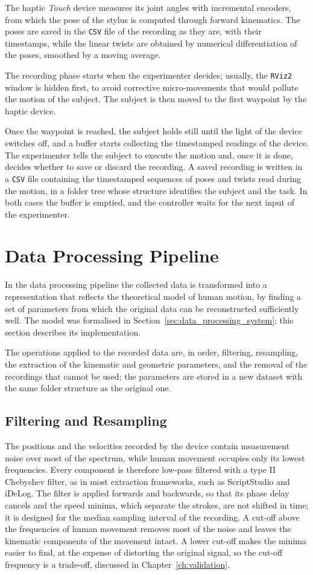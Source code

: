 \documentclass[12pt]{report}
\begin{document}
The haptic \textit{Touch} device measures its joint angles with incremental encoders, from which the pose of the stylus is computed through forward kinematics. The poses are saved in the \texttt{CSV} file of the recording as they are, with their timestamps, while the linear twists are obtained by numerical differentiation of the poses, smoothed by a moving average.

The recording phase starts when the experimenter decides; usually, the \texttt{RViz2} window is hidden first, to avoid corrective micro-movements that would pollute the motion of the subject. The subject is then moved to the first waypoint by the haptic device.

Once the waypoint is reached, the subject holds still until the light of the device switches off, and a buffer starts collecting the timestamped readings of the device. The experimenter tells the subject to execute the motion and, once it is done, decides whether to save or discard the recording. A saved recording is written in a \texttt{CSV} file containing the timestamped sequences of poses and twists read during the motion, in a folder tree whose structure identifies the subject and the task. In both cases the buffer is emptied, and the controller waits for the next input of the experimenter.

\section{Data Processing Pipeline}
In the data processing pipeline the collected data is transformed into a representation that reflects the theoretical model of human motion, by finding a set of parameters from which the original data can be reconstructed sufficiently well. The model was formalised in Section~\ref{sec:data_processing_system}; this section describes its implementation.

The operations applied to the recorded data are, in order, filtering, resampling, the extraction of the kinematic and geometric parameters, and the removal of the recordings that cannot be used; the parameters are stored in a new dataset with the same folder structure as the original one.

\subsection{Filtering and Resampling}
The positions and the velocities recorded by the device contain measurement noise over most of the spectrum, while human movement occupies only its lowest frequencies. Every component is therefore low-pass filtered with a type II Chebyshev filter, as in most extraction frameworks, such as ScriptStudio and iDeLog. The filter is applied forwards and backwards, so that its phase delay cancels and the speed minima, which separate the strokes, are not shifted in time; it is designed for the median sampling interval of the recording. A cut-off above the frequencies of human movement removes most of the noise and leaves the kinematic components of the movement intact. A lower cut-off makes the minima easier to find, at the expense of distorting the original signal, so the cut-off frequency is a trade-off, discussed in Chapter~\ref{ch:validation}.
\end{document}
